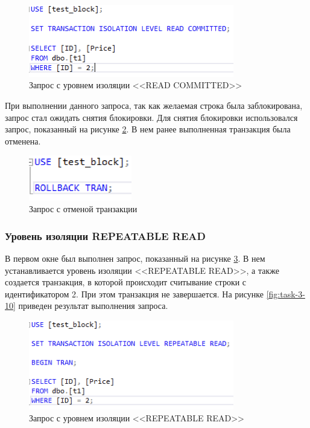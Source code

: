 \documentclass[a4paper, 14pt]{extarticle}
\begin{document}
\begin{figure}[H]
  \centering
  \includegraphics[width=0.8\textwidth]{images/task-3/7.png}
  \caption{
    Запрос с уровнем изоляции <<\foreignlanguage{english}{READ COMMITTED}>>
  }
  \label{fig:task-3-7}
\end{figure}

При выполнении данного запроса, так как желаемая строка была заблокирована,
запрос стал ожидать снятия блокировки. Для снятия блокировки использовался
запрос, показанный на рисунке \ref{fig:task-3-8}. В нем ранее выполненная
транзакция была отменена.

\begin{figure}[H]
  \centering
  \includegraphics[width=0.4\textwidth]{images/task-3/8.png}
  \caption{Запрос с отменой транзакции}
  \label{fig:task-3-8}
\end{figure}

\subsubsection{Уровень изоляции REPEATABLE READ}

В первом окне был выполнен запрос, показанный на рисунке \ref{fig:task-3-9}. В
нем устанавливается уровень изоляции <<\foreignlanguage{english}{REPEATABLE
READ}>>, а также создается транзакция, в которой происходит считывание строки с
идентификатором 2. При этом транзакция не завершается. На рисунке
\ref{fig:task-3-10} приведен результат выполнения запроса.

\begin{figure}[H]
  \centering
  \includegraphics[width=0.8\textwidth]{images/task-3/9.png}
  \caption{
    Запрос с уровнем изоляции <<\foreignlanguage{english}{REPEATABLE READ}>>
  }
  \label{fig:task-3-9}
\end{figure}
\end{document}
